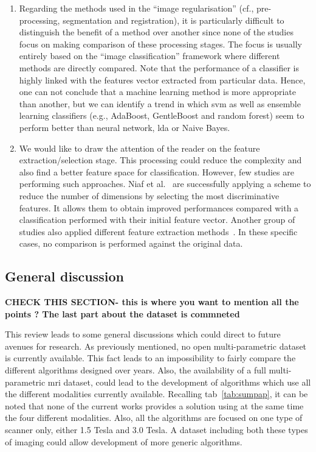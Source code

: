 \begin{enumerate}
\item Regarding the methods used in the ``image regularisation'' (cf., pre-processing, segmentation and registration), it is particularly difficult to distinguish the benefit of a method over another since none of the studies focus on making comparison of these processing stages. The focus is usually entirely based on the ``image classification'' framework where different methods are directly compared. Note that the performance of a classifier is highly linked with the features vector extracted from particular data. Hence, one can not conclude that a machine learning method is more appropriate than another, but we can identify a trend in which \ac{svm} as well as ensemble learning classifiers (e.g., AdaBoost, GentleBoost and random forest) seem to perform better than neural network, \ac{lda} or Naive Bayes.

\item We would like to draw the attention of the reader on the feature extraction/selection stage.
This processing could reduce the complexity and also find a better feature space for classification.
However, few studies are performing such approaches.
Niaf et al.~\cite{Niaf2011,Niaf2012} are successfully applying a scheme to reduce the number of dimensions by selecting the most discriminative features.
It allows them to obtain improved performances compared with a classification performed with their initial feature vector.
Another group of studies also applied different feature extraction methods~\cite{Viswanath2008a,Viswanath2008,Viswanath2012,Tiwari2007,Tiwari2008,Tiwari2009,Tiwari2010,Tiwari2012,Tiwari2013}.
In these specific cases, no comparison is performed against the original data.
\end{enumerate}

\subsection{General discussion}\label{subsec:chp3:dis:gen-dis}

{\color{red} \textbf{CHECK THIS SECTION- this is where you want to mention all the points ? The last part about the dataset is commneted}}

This review leads to some general discussions which could direct to future avenues for research.
As previously mentioned, no open multi-parametric dataset is currently available.
This fact leads to an impossibility to fairly compare the different algorithms designed over years.
Also, the availability of a full multi-parametric \ac{mri} dataset, could lead to the development of algorithms which use all the different modalities currently available.
Recalling \ac{tab}~\ref{tab:sumpap}, it can be noted that none of the current works provides a solution using at the same time the four different modalities.
Also, all the algorithms are focused on one type of scanner only, either 1.5 Tesla and 3.0 Tesla.
A dataset including both these types of imaging could allow development of more generic algorithms.

